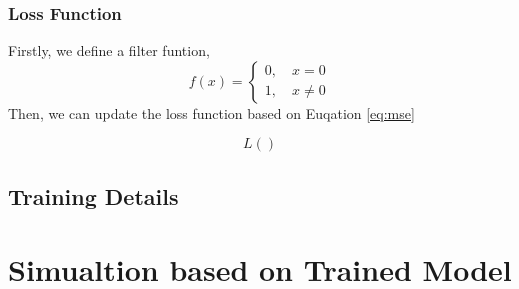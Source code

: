 \subsubsection{Loss Function}
Firstly, we define a filter funtion,
\begin{equation}
    f(x)= \begin{cases} 0, \quad x = 0 \\ 1, \quad x \ne 0 \end{cases}
\end{equation}
Then, we can update the loss function based on Euqation \ref{eq:mse}

\begin{equation}
    L()
\end{equation}

\subsection{Training Details}

\section{Simualtion based on Trained Model}
